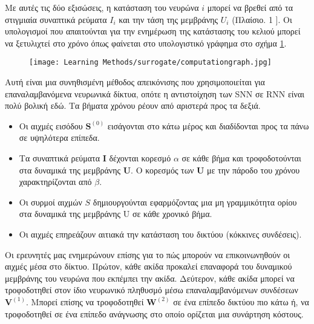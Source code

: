 \documentclass[12pt]{report}
\begin{document}
Με αυτές τις δύο εξισώσεις, η κατάσταση του νευρώνα $i$ μπορεί να βρεθεί από τα στιγμιαία συναπτικά ρεύματα $I_{i}$ και την τάση της μεμβράνης $U_{i}$ (Πλαίσιο. 1 $]. $ Οι υπολογισμοί που απαιτούνται για την ενημέρωση της κατάστασης του κελιού μπορεί να ξετυλιχτεί στο χρόνο όπως φαίνεται στο υπολογιστικό γράφημα στο σχήμα \ref{fig:computationgraph}.
\begin{figure}[htp]
    \centering
    \texttt{[image: Learning Methods/surrogate/computationgraph.jpg]}
    \caption{}
    \label{fig:computationgraph}
\end{figure}
Αυτή είναι μια συνηθισμένη μέθοδος απεικόνισης που χρησιμοποιείται για επαναλαμβανόμενα νευρωνικά δίκτυα, οπότε η αντιστοίχηση των \textlatin{SNN} σε \textlatin{RNN} είναι πολύ βολική εδώ. Τα βήματα χρόνου ρέουν από αριστερά προς τα δεξιά.
\begin{itemize}
    \item  Οι αιχμές εισόδου $\mathbf{S}^{(0)}$ εισάγονται στο κάτω μέρος και διαδίδονται προς τα πάνω σε υψηλότερα επίπεδα.
    \item  Τα συναπτικά ρεύματα $\mathbf{I}$ δέχονται κορεσμό $\alpha$ σε κάθε βήμα και τροφοδοτούνται στα δυναμικά της μεμβράνης  $\mathbf{U}$. Ο κορεσμός των $\mathbf{U}$ με την πάροδο του χρόνου χαρακτηρίζονται από $\beta .$
    \item Οι συρμοί αιχμών $S$ δημιουργούνται εφαρμόζοντας μια μη γραμμικότητα ορίου στα δυναμικά της μεμβράνης $\mathrm{U}$ σε κάθε χρονικό βήμα.
    \item  Οι αιχμές επηρεάζουν αιτιακά την κατάσταση του δικτύου (κόκκινες συνδέσεις).
    
\end{itemize}
Οι ερευνητές μας ενημερώνουν επίσης για το πώς μπορούν να επικοινωνηθούν οι αιχμές μέσα στο δίκτυο.
Πρώτον, κάθε ακίδα προκαλεί επαναφορά του δυναμικού μεμβράνης του νευρώνα που εκπέμπει την ακίδα. Δεύτερον, κάθε ακίδα μπορεί να τροφοδοτηθεί στον ίδιο νευρωνικό πληθυσμό μέσω επαναλαμβανόμενων συνδέσεων $\mathbf{V}^{(1)}$. Μπορεί επίσης να τροφοδοτηθεί $\mathbf{W}^{(2)}$ σε ένα επίπεδο δικτύου πιο κάτω ή, να τροφοδοτηθεί σε ένα επίπεδο ανάγνωσης στο οποίο ορίζεται μια συνάρτηση κόστους.
\end{document}
